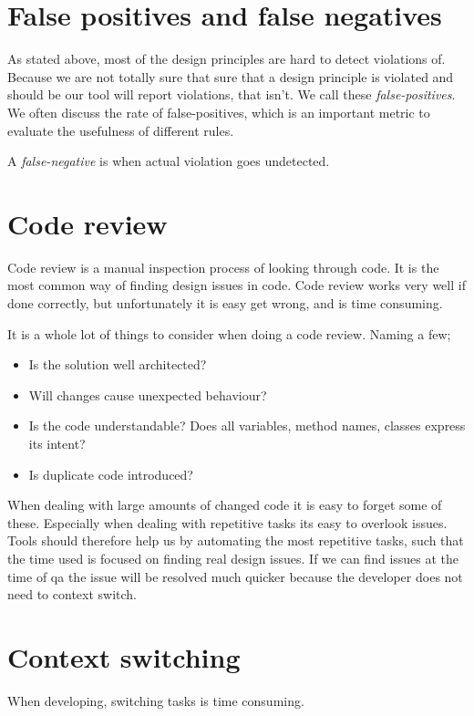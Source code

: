 \documentclass{report}
\begin{document}
\section{False positives and false negatives}
As stated above, most of the design principles are hard to detect violations of. Because we are not totally sure that sure that a design principle is violated and should be our tool will report violations, that isn't. We call these \textit{false-positives}. We often discuss the rate of false-positives, which is an important metric to evaluate the usefulness of different rules.

A \textit{false-negative} is when actual violation goes undetected. 


\section{Code review}
\label{code-review}
Code review is a manual inspection process of looking through code. It is the most common way of finding design issues in code. Code review works very well if done correctly, but unfortunately it is easy get wrong, and is time consuming. 

It is a whole lot of things to consider when doing a code review. Naming a few;

\begin{itemize}
    \item Is the solution well architected?
    \item Will changes cause unexpected behaviour? 
    \item Is the code understandable? Does all variables, method names, classes express its intent?
    \item Is duplicate code introduced?
\end{itemize}

When dealing with large amounts of changed code it is easy to forget some of these. Especially when dealing with repetitive tasks its easy to overlook issues. Tools should therefore help us by automating the most repetitive tasks, such that the time used is focused on finding real design issues. If we can find issues at the time of \gls{qa} the issue will be resolved much quicker because the developer does not need to context switch.

\section{Context switching}
When developing, switching tasks is time consuming. 
\end{document}
